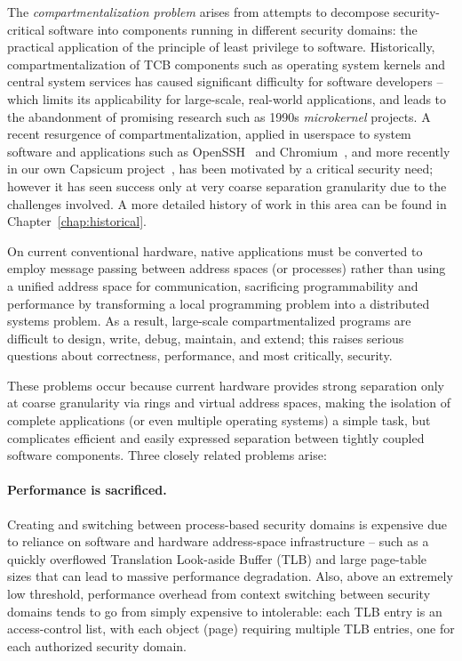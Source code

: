 The {\em compartmentalization problem} arises from attempts to decompose
security-critical software into components running in different security
domains: the practical application of the principle of least privilege to
software.
Historically, compartmentalization of TCB components such as operating system kernels
and central system services has caused significant
difficulty for software developers -- which limits its applicability for large-scale, 
real-world applications, and leads to the abandonment of promising research
such as 1990s {\em microkernel} projects.
A recent resurgence of compartmentalization, applied in userspace to system software and applications
such as OpenSSH~\cite{provos:preventingprivesc} and Chromium~\cite{reis:chromium},
and more recently in our own Capsicum project~\cite{Watson10}, has been motivated by a
critical security need; however it has seen success only at very coarse separation granularity due to 
the challenges involved.
A more detailed history of work in this area can be found in
Chapter~\ref{chap:historical}.

On current conventional hardware, native applications must be converted to employ message
passing between address spaces (or processes) rather than using a unified address space
for communication, sacrificing programmability and performance by transforming a local
programming problem into a distributed systems problem.
As a result, large-scale compartmentalized programs are difficult to design, write, debug,
maintain, and extend; this raises serious questions about correctness, performance, and most
critically, security.

These problems occur because current hardware provides strong separation
only at coarse granularity via rings and virtual address spaces, making 
the isolation of complete applications (or even multiple operating systems)
a simple task, but complicates
efficient and easily expressed separation between tightly coupled software
components.
Three closely related problems arise:

\paragraph{Performance is sacrificed.}
Creating and switching between process-based security domains is expensive due
to reliance on software and hardware address-space infrastructure -- such as a
quickly overflowed Translation Look-aside Buffer (TLB) and large page-table
sizes that can lead to massive performance degradation.
Also, above an extremely low threshold, performance overhead from context
switching between security domains tends to go from simply expensive to
intolerable: each TLB entry is an access-control list, with each object (page)
requiring multiple TLB entries, one for each authorized security domain.

